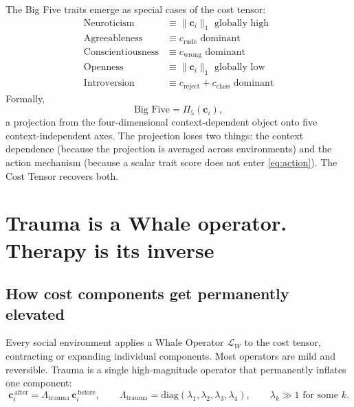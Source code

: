 \documentclass[12pt,a4paper]{article}
\begin{document}
The Big Five traits emerge as special cases of the cost tensor:
\begin{align}
  \text{Neuroticism}      &\equiv \|\mathbf{c}_i\|_1 \text{ globally high} \\
  \text{Agreeableness}    &\equiv c_{\mathrm{rude}} \text{ dominant} \\
  \text{Conscientiousness} &\equiv c_{\mathrm{wrong}} \text{ dominant} \\
  \text{Openness}         &\equiv \|\mathbf{c}_i\|_1 \text{ globally low} \\
  \text{Introversion}     &\equiv c_{\mathrm{reject}} + c_{\mathrm{class}} \text{ dominant}
\end{align}
Formally,
\begin{equation}
  \text{Big Five} = \Pi_5(\mathbf{c}_i),
  \label{eq:projection}
\end{equation}
a projection from the four-dimensional context-dependent object onto five context-independent axes. The projection loses two things: the context dependence (because the projection is averaged across environments) and the action mechanism (because a scalar trait score does not enter \eqref{eq:action}). The Cost Tensor recovers both.

\section{Trauma is a Whale operator. Therapy is its inverse}
\label{sec:trauma}

\subsection{How cost components get permanently elevated}

Every social environment applies a Whale Operator $\mathcal{L}_W$ to the cost tensor, contracting or expanding individual components. Most operators are mild and reversible. Trauma is a single high-magnitude operator that permanently inflates one component:
\begin{equation}
  \mathbf{c}_i^{\,\mathrm{after}} = \Lambda_{\mathrm{trauma}} \, \mathbf{c}_i^{\,\mathrm{before}},
  \qquad
  \Lambda_{\mathrm{trauma}} = \mathrm{diag}(\lambda_1, \lambda_2, \lambda_3, \lambda_4),
  \qquad
  \lambda_k \gg 1 \text{ for some } k.
  \label{eq:trauma}
\end{equation}
\end{document}
